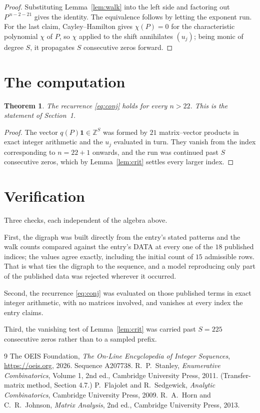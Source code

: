 \documentclass[11pt,a4paper]{article}
\theoremstyle{plain}
\newtheorem{theorem}{Theorem}
\theoremstyle{definition}
\begin{document}
\begin{proof}
Substituting Lemma~\ref{lem:walk} into the left side and factoring out
$P^{\,n-2-21}$ gives the identity. The equivalence follows by letting the exponent
run. For the last claim, Cayley--Hamilton gives $\chi(P)=0$ for the characteristic
polynomial $\chi$ of $P$, so $\chi$ applied to the shift annihilates $(u_j)$; being monic of
degree $S$, it propagates $S$ consecutive zeros forward.
\end{proof}

\section{The computation}

\begin{theorem}
The recurrence \eqref{eq:conj} holds for every $n>22$. This is the statement of
Section~1.
\end{theorem}

\begin{proof}
The vector $q(P)\mathbf{1}\in\mathbb{Z}^{S}$ was formed by $21$ matrix--vector
products in exact integer arithmetic and the $u_j$ evaluated in turn. They vanish from the
index corresponding to $n=22+1$ onwards, and the run was continued past $S$ consecutive
zeros, which by Lemma~\ref{lem:crit} settles every larger index.
\end{proof}

\section{Verification}

Three checks, each independent of the algebra above.

First, the digraph was built directly from the entry's stated patterns and the walk counts
compared against the entry's DATA at every one of the $18$ published indices; the
values agree exactly, including the initial count of $15$ admissible rows. That is
what ties the digraph to the sequence, and a model reproducing only part of the published
data was rejected wherever it occurred.

Second, the recurrence \eqref{eq:conj} was evaluated on those published terms in exact
integer arithmetic, with no matrices involved, and vanishes at every index the entry claims.

Third, the vanishing test of Lemma~\ref{lem:crit} was carried past $S=225$ consecutive
zeros rather than to a sampled prefix.

\begin{thebibliography}{9}
 The OEIS Foundation, \emph{The On-Line Encyclopedia of Integer
Sequences}, \url{https://oeis.org}, 2026. Sequence A207738.
 R.~P.~Stanley, \emph{Enumerative Combinatorics}, Volume 1, 2nd ed.,
Cambridge University Press, 2011. (Transfer-matrix method, Section 4.7.)
 P.~Flajolet and R.~Sedgewick, \emph{Analytic Combinatorics}, Cambridge
University Press, 2009.
 R.~A.~Horn and C.~R.~Johnson, \emph{Matrix Analysis}, 2nd ed., Cambridge
University Press, 2013.
\end{thebibliography}
\end{document}
